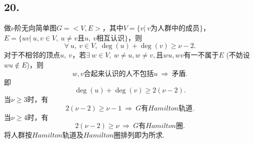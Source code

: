 \documentclass{article}
\begin{document}
\subsection*{20.}
    做$\nu$阶无向简单图$G=<V,E>$，其中$V=\{v|\ v\mbox{为人群中的成员}\}$，$E=\{uv|\ u,v\in V,\ u\neq v\mbox{且}u,\ v\mbox{相互认识}\}$，则
    \[
        \forall\ u,\ v\in V,\ \deg(u)+\deg (v)\geq \nu -2.
    \]
    对于不相邻的顶点$u,\ v$，若$\exists\ w\in V,\ w\neq u,w\neq v,\mbox{且} wu,wv$有一不属于$E$ (不妨设$wu\notin E$)，则
    \[
        w,v\mbox{合起来认识的人不包括}u \ \Rightarrow\ \mbox{矛盾}.
    \]
    即
    \[
        \deg(u)+\deg (v) \geq 2(\nu-2).
    \]
    当$\nu \geq 3$时，有
    \[
        2(\nu -2)\geq \nu -1\ \Rightarrow\ G\mbox{有}Hamilton\mbox{轨道}.
    \]
    当$\nu \geq 4$时，有
    \[
        2(\nu -2)\geq \nu\ \Rightarrow\ G\mbox{有}Hamilton\mbox{圈}.
    \]
    将人群按$Hamilton$轨道及$Hamilton$圈排列即为所求.
    
    \clearpage
\end{document}
